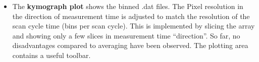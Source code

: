 \begin{itemize}
\begin{itemize}
	\end{itemize}
\item The \textbf{kymograph plot} shows the binned \mytilde .dat files. The Pixel resolution in the direction of measurement time is adjusted to match the resolution of the scan cycle time (bins per scan cycle). This is implemented by slicing the array and showing only a few slices in measurement time ``direction''. So far, no disadvantages compared to averaging have been observed. The plotting area contains a useful toolbar.
\end{itemize}


